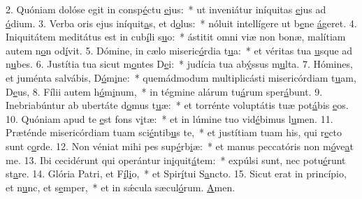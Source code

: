 2. Quóniam dolóse egit in consp\uline{é}ctu \uline{e}jus:~* ut inveniátur iníquitas \uline{e}jus ad \uline{ó}dium.
3. Verba oris ejus iníquit\uline{a}s, et d\uline{o}lus:~* nóluit intellígere ut b\uline{e}ne \uline{á}geret.
4. Iniquitátem meditátus est in cub\uline{í}li s\uline{u}o:~* ástitit omni viæ non bonæ, malítiam autem n\uline{o}n od\uline{í}vit.
5. Dómine, in cælo miseric\uline{ó}rdia t\uline{u}a:~* et véritas tua \uline{u}sque ad n\uline{u}bes.
6. Justítia tua sicut m\uline{o}ntes D\uline{e}i:~* judícia tua ab\uline{ý}ssus m\uline{u}lta.
7. Hómines, et juménta salvábis, D\uline{ó}m\uline{i}ne:~* quemádmodum multiplicásti misericórdiam t\uline{u}am, D\uline{e}us,
8. Fílii autem h\uline{ó}m\uline{i}num,~* in tégmine alárum tu\uline{á}rum sper\uline{á}bunt.
9. Inebriabúntur ab ubertáte d\uline{o}mus t\uline{u}æ:~* et torrénte voluptátis tuæ pot\uline{á}bis \uline{e}os.
10. Quóniam apud te \uline{e}st fons v\uline{i}tæ:~* et in lúmine tuo vid\uline{é}bimus l\uline{u}men.
11. Præténde misericórdiam tuam sci\uline{é}ntib\uline{u}s te,~* et justítiam tuam his, qui r\uline{e}cto sunt c\uline{o}rde.
12. Non véniat mihi pes sup\uline{é}rb\uline{i}æ:~* et manus peccatóris non m\uline{ó}ve\uline{a}t me.
13. Ibi cecidérunt qui operántur in\uline{i}quit\uline{á}tem:~* expúlsi sunt, nec potu\uline{é}runt st\uline{a}re.
14. Glória Patri, et F\uline{í}l\uline{i}o,~* et Spir\uline{í}tui S\uline{a}ncto.
15. Sicut erat in princípio, et n\uline{u}nc, et s\uline{e}mper,~* et in sǽcula sæcul\uline{ó}rum. \uline{A}men.
